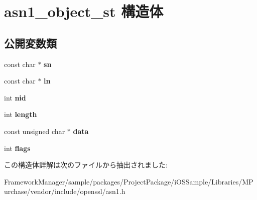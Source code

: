 \hypertarget{structasn1__object__st}{}\section{asn1\+\_\+object\+\_\+st 構造体}
\label{structasn1__object__st}
\subsection*{公開変数類}
\begin{DoxyCompactItemize}
\item 
\hypertarget{structasn1__object__st_a354a9532f5135bf342293f28af850177}{}const char $\ast$ {\bfseries sn}\label{structasn1__object__st_a354a9532f5135bf342293f28af850177}

\item 
\hypertarget{structasn1__object__st_a02d44fa6f642b789372cf8f57f7f0f12}{}const char $\ast$ {\bfseries ln}\label{structasn1__object__st_a02d44fa6f642b789372cf8f57f7f0f12}

\item 
\hypertarget{structasn1__object__st_a1506f26770df5e823c217dea262bd64f}{}int {\bfseries nid}\label{structasn1__object__st_a1506f26770df5e823c217dea262bd64f}

\item 
\hypertarget{structasn1__object__st_aebd85f3c9bec7ccf21ce77aa71c78ce1}{}int {\bfseries length}\label{structasn1__object__st_aebd85f3c9bec7ccf21ce77aa71c78ce1}

\item 
\hypertarget{structasn1__object__st_a076f159c5190422adbe799dc10aa8ebe}{}const unsigned char $\ast$ {\bfseries data}\label{structasn1__object__st_a076f159c5190422adbe799dc10aa8ebe}

\item 
\hypertarget{structasn1__object__st_adfe42f89b19fcc6da297e98a54c57ac6}{}int {\bfseries flags}\label{structasn1__object__st_adfe42f89b19fcc6da297e98a54c57ac6}

\end{DoxyCompactItemize}


この構造体詳解は次のファイルから抽出されました\+:\begin{DoxyCompactItemize}
\item 
Framework\+Manager/sample/packages/\+Project\+Package/i\+O\+S\+Sample/\+Libraries/\+M\+Purchase/vendor/include/openssl/asn1.\+h\end{DoxyCompactItemize}
